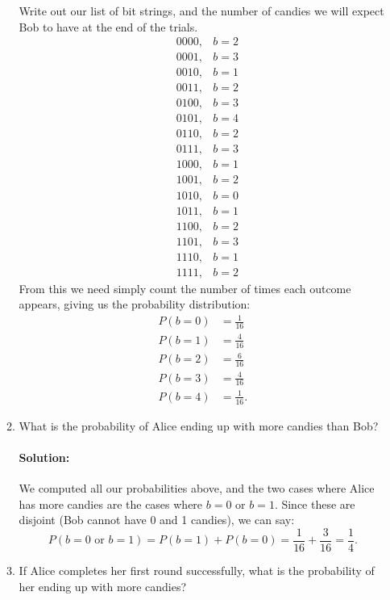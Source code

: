\documentclass{article}
\begin{document}
\begin{enumerate}
\begin{enumerate}
    Write out our list of bit strings, and the number of candies we will expect Bob to have at the end of the trials. 
        \begin{align*}
            &0000,  &b=2\\
            &0001,  &b=3\\
            &0010,  &b=1\\
            &0011,  &b=2\\
            &0100,  &b=3\\
            &0101,  &b=4\\
            &0110,  &b=2\\
            &0111,  &b=3\\
            &1000,  &b=1\\
            &1001,  &b=2\\
            &1010,  &b=0\\
            &1011,  &b=1\\
            &1100,  &b=2\\
            &1101,  &b=3\\
            &1110,  &b=1\\
            &1111,  &b=2
        \end{align*}
    From this we need simply count the number of times each outcome appears, giving us the probability distribution:
    \begin{align*}
        P(b=0)&=\frac{1}{16}\\
        P(b=1)&=\frac{4}{16}\\
        P(b=2)&=\frac{6}{16}\\
        P(b=3)&=\frac{4}{16}\\
        P(b=4)&=\frac{1}{16}
    .\end{align*}
    \item What is the probability of Alice ending up with more candies than Bob?
        \paragraph{Solution: }We computed all our probabilities above, and the two cases where Alice has more candies are the cases where $b=0$ or $b=1$. Since these are disjoint (Bob cannot have 0 and 1 candies), we can say:
          \[
            P(b=0 \text{ or }b=1)=P(b=1)+P(b=0)=\frac{1}{16}+\frac{3}{16}=\frac{1}{4}
          .\] 
    \item If Alice completes her first round successfully, what is the probability of her ending up with more candies?


\end{enumerate}
\end{enumerate}
\end{document}
